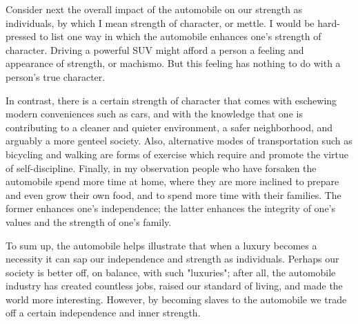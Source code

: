 Consider next the overall impact of the automobile on our strength as individuals, by which I mean strength of character, or mettle.
I would be hard-pressed to list one way in which the automobile enhances one's strength of character.
Driving a powerful SUV might afford a person a feeling and appearance of strength, or machismo.
But this feeling has nothing to do with a person's true character.


In contrast, there is a certain strength of character that comes with eschewing modern conveniences such as cars, and with the knowledge that one is contributing to a cleaner and quieter environment, a safer neighborhood, and arguably a more genteel society.
Also, alternative modes of transportation such as bicycling and walking are forms of exercise which require and promote the virtue of self-discipline.
Finally, in my observation people who have forsaken the automobile spend more time at home, where they are more inclined to prepare and even grow their own food, and to spend more time with their families.
The former enhances one's independence; the latter enhances the integrity of one's values and the strength of one's family.


To sum up, the automobile helps illustrate that when a luxury becomes a necessity it can sap our independence and strength as individuals.
Perhaps our society is better off, on balance, with such "luxuries"; after all, the automobile industry has created countless jobs, raised our standard of living, and made the world more interesting.
However, by becoming slaves to the automobile we trade off a certain independence and inner strength.
